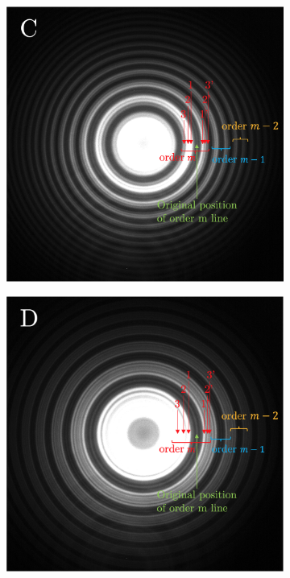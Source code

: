\documentclass[11pt]{article}
\begin{document}
\begin{figure}[h!]
\begin{subfigure}{0.47\linewidth}
    \end{subfigure}
    \begin{subfigure}{0.47\linewidth}
        \includegraphics[width=\linewidth]{Cd green/C2.png}
    \end{subfigure}
    \begin{subfigure}{0.47\linewidth}
        \includegraphics[width=\linewidth]{Cd green/D2.png}

\end{subfigure}
\end{figure}
\end{document}
